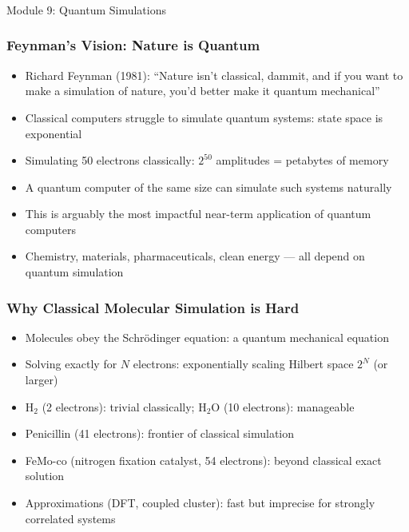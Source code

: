 
\begin{frame}[fragile]\frametitle{}
\begin{center}
{\Large Module 9: Quantum Simulations}
\end{center}
\end{frame}

\begin{frame}[fragile]\frametitle{Feynman's Vision: Nature is Quantum}
\begin{itemize}
\item Richard Feynman (1981): ``Nature isn't classical, dammit, and if you want to make a simulation of nature, you'd better make it quantum mechanical''
\item Classical computers struggle to simulate quantum systems: state space is exponential
\item Simulating 50 electrons classically: $2^{50}$ amplitudes = petabytes of memory
\item A quantum computer of the same size can simulate such systems naturally
\item This is arguably the most impactful near-term application of quantum computers
\item Chemistry, materials, pharmaceuticals, clean energy --- all depend on quantum simulation
\end{itemize}
\end{frame}

\begin{frame}[fragile]\frametitle{Why Classical Molecular Simulation is Hard}
\begin{itemize}
\item Molecules obey the Schr\"{o}dinger equation: a quantum mechanical equation
\item Solving exactly for $N$ electrons: exponentially scaling Hilbert space $2^N$ (or larger)
\item H$_2$ (2 electrons): trivial classically; H$_2$O (10 electrons): manageable
\item Penicillin (41 electrons): frontier of classical simulation
\item FeMo-co (nitrogen fixation catalyst, 54 electrons): beyond classical exact solution
\item Approximations (DFT, coupled cluster): fast but imprecise for strongly correlated systems
\end{itemize}
\end{frame}

